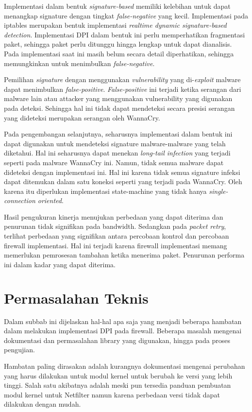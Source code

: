 Implementasi dalam bentuk \textit{signature-based} memiliki kelebihan untuk dapat menangkap signature dengan tingkat \textit{false-negative} yang kecil. Implementasi pada iptables merupakan bentuk implementasi \textit{realtime dynamic signature-based detection}. Implementasi DPI dalam bentuk ini perlu memperhatikan fragmentasi paket, sehingga paket perlu ditunggu hingga lengkap untuk dapat dianalisis. Pada implementasi saat ini masih belum secara detail diperhatikan, sehingga memungkinkan untuk menimbulkan \textit{false-negative}.

Pemilihan \textit{signature} dengan menggunakan \textit{vulnerability} yang di-\textit{exploit} malware dapat menimbulkan \textit{false-positive}. \textit{False-positive} ini terjadi ketika serangan dari malware lain atau attacker yang menggunakan vulnerability yang digunakan pada deteksi. Sehingga hal ini tidak dapat mendeteksi secara presisi serangan yang dideteksi merupakan serangan oleh WannaCry.

Pada pengembangan selanjutnya, seharusnya implementasi dalam bentuk ini dapat digunakan untuk mendeteksi signature malware-malware yang telah diketahui. Hal ini seharusnya dapat menekan \textit{long-tail infection} yang terjadi seperti pada malware WannaCry ini. Namun, tidak semua malware dapat dideteksi dengan implementasi ini. Hal ini karena tidak semua signature infeksi dapat ditemukan dalam satu koneksi seperti yang terjadi pada WannaCry. Oleh karena itu diperlukan implementasi state-machine yang tidak hanya \textit{single-connection oriented}.

Hasil pengukuran kinerja menujukan perbedaan yang dapat diterima dan penurunan tidak signifikan pada bandwidth. Sedangkan pada \textit{packet retry}, terlihat perbedaan yang signifikan antara percobaan kontrol dan percobaan firewall implementasi. Hal ini terjadi karena firewall implementasi memang memerlukan pemrosesan tambahan ketika menerima paket. Penurunan performa ini dalam kadar yang dapat diterima.

\section{Permasalahan Teknis}

Dalam subbab ini dijelaskan hal-hal apa saja yang menjadi beberapa hambatan dalam melakukan implementasi DPI pada firewall. Beberapa masalah mengenai dokumentasi dan permasalahan library yang digunakan, hingga pada proses pengujian.

Hambatan paling dirasakan adalah kurangnya dokumentasi mengenai perubahan yang harus dilakukan untuk modul kernel untuk berubah ke versi yang lebih tinggi. Salah satu akibatnya adalah meski pun tersedia panduan pembuatan modul kernel untuk Netfilter namun karena perbedaan versi tidak dapat dilakukan dengan mudah.

